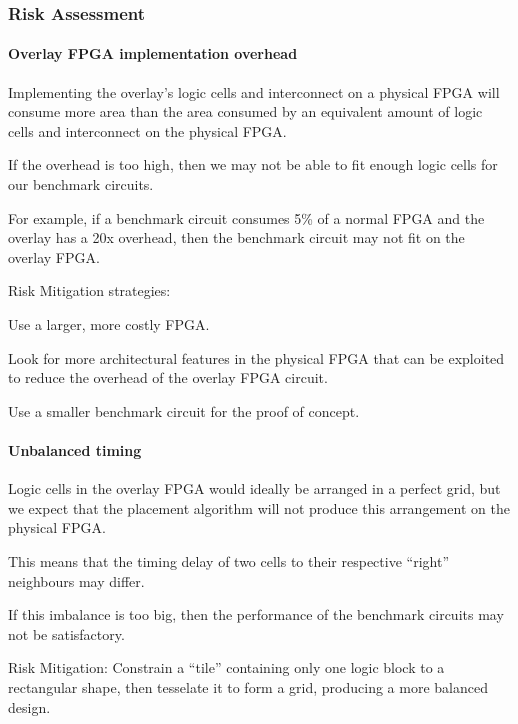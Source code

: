 \subsubsection{Risk Assessment}

\paragraph{Overlay FPGA implementation overhead}
\label{risk-size}

\begin{itemlist}
	\item Implementing the overlay's logic cells and interconnect on a physical FPGA will consume more area than the area consumed by an equivalent amount of logic cells and interconnect on the physical FPGA.
	\item If the overhead is too high, then we may not be able to fit enough logic cells for our benchmark circuits.
	\item For example, if a benchmark circuit consumes 5\% of a normal FPGA and the overlay has a 20x overhead, then the benchmark circuit may not fit on the overlay FPGA.
	\item Risk Mitigation strategies: \
		\begin{itemlist}
			\item Use a larger, more costly FPGA.
			\item Look for more architectural features in the physical FPGA that can be exploited to reduce the overhead of the overlay FPGA circuit.
			\item Use a smaller benchmark circuit for the proof of concept.
		\end{itemlist}
\end{itemlist}

\paragraph{Unbalanced timing}

\begin{itemlist}
	\item Logic cells in the overlay FPGA would ideally be arranged in a perfect grid, but we expect that the placement algorithm will not produce this arrangement on the physical FPGA.
	\item This means that the timing delay of two cells to their respective ``right'' neighbours may differ.
	\item If this imbalance is too big, then the performance of the benchmark circuits may not be satisfactory.
	\item Risk Mitigation: Constrain a ``tile'' containing only one logic block to a rectangular shape, then tesselate it to form a grid, producing a more balanced design.
\end{itemlist}

